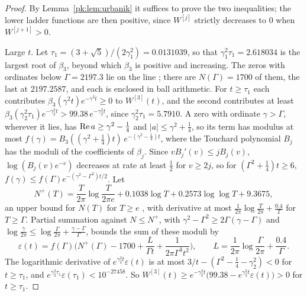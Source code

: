 \begin{proof}
By Lemma~\ref{pk:lem:urbanik} it suffices to prove the two inequalities; the lower ladder functions are then positive, since $W^{[j]}$ strictly decreases to $0$ when $W^{[j+1]}>0$.

Large $t$. Let $\tau_1=(3+\sqrt5)/(2\gamma_1^2)=0.0131039$, so that $\gamma_1^2\tau_1=2.618034$ is the largest root of $\beta_3$, beyond which $\beta_3$ is positive and increasing. The zeros with ordinates below $\Gamma=2197.3$ lie on the line \cite{PT21}; there are $N(\Gamma)=1700$ of them, the last at $2197.2587$, and each is enclosed in ball arithmetic. For $t\ge\tau_1$ each contributes $\beta_3(\gamma^2t)e^{-\gamma^2t}\ge0$ to $W^{[3]}(t)$, and the second contributes at least $\beta_3(\gamma_2^2\tau_1)e^{-\gamma_2^2t}>99.38\,e^{-\gamma_2^2t}$, since $\gamma_2^2\tau_1=5.7910$. A zero with ordinate $\gamma>\Gamma$, wherever it lies, has $\operatorname{Re} a\ge\gamma^2-\frac14$ and $|a|\le\gamma^2+\frac14$, so its term has modulus at most $f(\gamma)=B_3((\gamma^2+\frac14)t)\,e^{-(\gamma^2-\frac14)t}$, where the Touchard polynomial $B_j$ has the moduli of the coefficients of $\beta_j$. Since $vB_j'(v)\le jB_j(v)$, $\log(B_j(v)e^{-v})$ decreases at rate at least $\frac12$ for $v\ge2j$, so for $(\Gamma^2+\frac14)t\ge6$, $f(\gamma)\le f(\Gamma)e^{-(\gamma^2-\Gamma^2)t/2}$. Let
\[
N^+(T)=\frac T{2\pi}\log\frac T{2\pi e}+0.1038\log T+0.2573\log\log T+9.3675,
\]
an upper bound for $N(T)$ for $T\ge e$ \cite[Corollary 1.2]{HSW22}, with derivative at most $\frac1{2\pi}\log\frac T{2\pi}+\frac{0.4}T$ for $T\ge\Gamma$. Partial summation against $N\le N^+$, with $\gamma^2-\Gamma^2\ge2\Gamma(\gamma-\Gamma)$ and $\log\frac\gamma{2\pi}\le\log\frac\Gamma{2\pi}+\frac{\gamma-\Gamma}\Gamma$, bounds the sum of these moduli by
\[
\varepsilon(t)=f(\Gamma)\Big(N^+(\Gamma)-1700+\frac L{\Gamma t}+\frac1{2\pi\Gamma^3t^2}\Big),\qquad L=\frac1{2\pi}\log\frac\Gamma{2\pi}+\frac{0.4}\Gamma .
\]
The logarithmic derivative of $e^{\gamma_2^2t}\varepsilon(t)$ is at most $3/t-(\Gamma^2-\frac14-\gamma_2^2)<0$ for $t\ge\tau_1$, and $e^{\gamma_2^2\tau_1}\varepsilon(\tau_1)<10^{-27458}$. So $W^{[3]}(t)\ge e^{-\gamma_2^2t}\big(99.38-e^{\gamma_2^2t}\varepsilon(t)\big)>0$ for $t\ge\tau_1$.


\end{proof}
